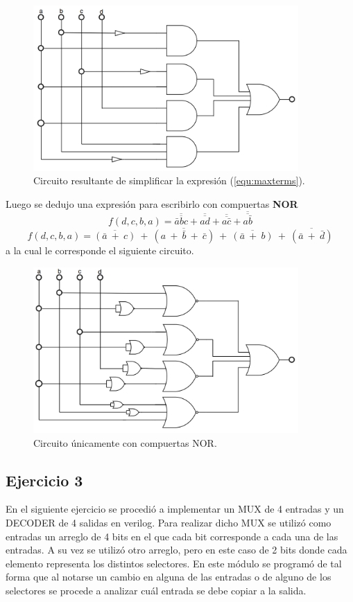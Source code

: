 \documentclass[a4paper]{article}
\begin{document}
\begin{figure}[H]
	\centering
	\includegraphics[width=0.9\textwidth]{Circuito2.PNG}
\caption{Circuito resultante de simplificar la expresión (\ref{equ:maxterms}).}
	\label{fig:circ2}
\end{figure}
Luego se dedujo una expresión para escribirlo con compuertas \textbf{NOR}
\[
	f \left( d,c,b,a \right) = \overline{\overline{\bar{a} b c}} + \overline{\overline{a d}} + \overline{\overline{a \bar{c}}} + \overline{\overline{a \bar{b}}}
\]
\[
	f \left( d,c,b,a \right) = \overline{ \left( \bar{a} \ + \ c \right) } \ + \ \overline{ \left( a \ + \ \bar{b} \ + \ \bar{c} \right) } \ + \ \overline{ \left( \bar{a} \ + \ b \right) } \ + \ \overline{ \left( \bar{a} \ + \ \bar{d}\right) }
\]
a la cual le corresponde el siguiente circuito.

\begin{figure}[H]
	\centering
	\includegraphics[width=0.9\textwidth]{Circuito5.png}
\caption{Circuito únicamente con compuertas NOR.}
	\label{fig:circ5}
\end{figure}
\subsection*{Ejercicio 3}
En el siguiente ejercicio se procedió a implementar un MUX de 4 entradas y un DECODER de 4 salidas en verilog.
Para realizar dicho MUX se utilizó como entradas un arreglo de 4 bits en el que cada bit corresponde a cada una de las entradas. A su vez se utilizó otro arreglo, pero en este caso de 2 bits donde cada elemento representa los distintos selectores. En este módulo se programó de tal forma que al notarse un cambio en alguna de las entradas o de alguno de los selectores se procede a analizar cuál entrada se debe copiar a la salida.
\end{document}
